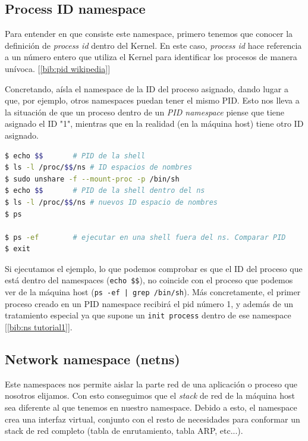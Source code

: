 \documentclass[12pt]{article}
\begin{document}
	\pagebreak
	
	\subsection{Process ID namespace}
	\par \noindent Para entender en que consiste este namespace, primero tenemos que conocer la definición de \textit{process id} dentro del Kernel. En este caso, \textit{process id} hace referencia a un número entero que utiliza el Kernel para identificar los procesos de manera unívoca. [\ref{bib:pid wikipedia}]\\
	
	\par \noindent Concretando, aísla el namespace de la ID del proceso asignado, dando lugar a que, por ejemplo, otros namespaces puedan tener el mismo PID. Esto nos lleva a la situación de que un proceso dentro de un \textit{PID namespace} piense que tiene asignado el ID "1", mientras que en la realidad (en la máquina host) tiene otro ID asignado.
	
	\addvspace{10px}
	
	\begin{lstlisting}[language=bash, caption=Uso de process id namespace]
$ echo $$		# PID de la shell
$ ls -l /proc/$$/ns	# ID espacios de nombres 
$ sudo unshare -f --mount-proc -p /bin/sh
$ echo $$		# PID de la shell dentro del ns
$ ls -l /proc/$$/ns	# nuevos ID espacio de nombres
$ ps

$ ps -ef 		# ejecutar en una shell fuera del ns. Comparar PID
$ exit
	\end{lstlisting}

	\addvspace{10px}
	
	\par \noindent Si ejecutamos el ejemplo, lo que podemos comprobar es que el ID del proceso que está dentro del namespaces (\texttt{echo \$\$}), no coincide con el proceso que podemos ver de la máquina host (\texttt{ps -ef | grep /bin/sh}). Más concretamente, el primer proceso creado en un PID namespace recibirá el pid número 1, y además de un tratamiento especial ya que supone  un \texttt{init process} dentro de ese namespace [\ref{bib:ns tutorial1}].
	
	
	\pagebreak
	
	\subsection{Network namespace (netns)}
	\par \noindent Este namespaces nos permite aislar la parte red de una aplicación o proceso que nosotros elijamos. Con esto conseguimos que el \textit{stack} de red de la máquina host sea diferente al que tenemos en nuestro namespace. Debido a esto, el namespace crea una interfaz virtual, conjunto con el resto de necesidades para conformar un stack de red completo (tabla de enrutamiento, tabla ARP, etc...).\\
	
\end{document}

